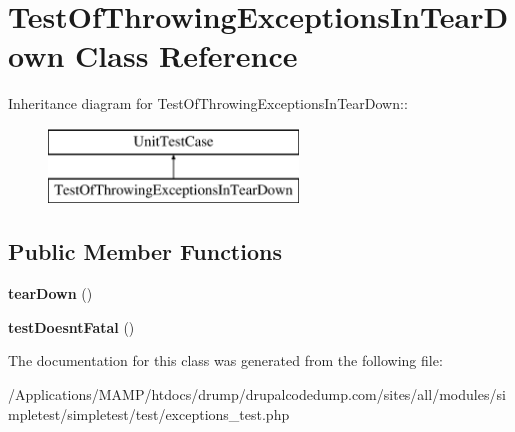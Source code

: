 \hypertarget{class_test_of_throwing_exceptions_in_tear_down}{
\section{TestOfThrowingExceptionsInTearDown Class Reference}
\label{class_test_of_throwing_exceptions_in_tear_down}
}
Inheritance diagram for TestOfThrowingExceptionsInTearDown::\begin{figure}[H]
\begin{center}
\leavevmode
\includegraphics[height=2cm]{class_test_of_throwing_exceptions_in_tear_down}
\end{center}
\end{figure}
\subsection*{Public Member Functions}
\begin{DoxyCompactItemize}
\item 
\hypertarget{class_test_of_throwing_exceptions_in_tear_down_a5798dd81545272bc3ae83faac11e19f5}{
{\bfseries tearDown} ()}
\label{class_test_of_throwing_exceptions_in_tear_down_a5798dd81545272bc3ae83faac11e19f5}

\item 
\hypertarget{class_test_of_throwing_exceptions_in_tear_down_a495156825d71d200660155b97cfbf865}{
{\bfseries testDoesntFatal} ()}
\label{class_test_of_throwing_exceptions_in_tear_down_a495156825d71d200660155b97cfbf865}

\end{DoxyCompactItemize}


The documentation for this class was generated from the following file:\begin{DoxyCompactItemize}
\item 
/Applications/MAMP/htdocs/drump/drupalcodedump.com/sites/all/modules/simpletest/simpletest/test/exceptions\_\-test.php\end{DoxyCompactItemize}
